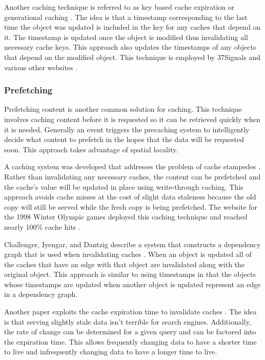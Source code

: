 \documentclass[12pt]{ucthesis}
\begin{document}
Another caching technique is referred to as key based cache expiration \cite{keyBasedCacheExpiration} or generational caching \cite{generationalCaching}.
The idea is that a timestamp corresponding to the last time the object was updated is included in the key for any caches that depend on it.
The timestamp is updated once the object is modified thus invalidating all necessary cache keys.
This approach also updates the timestamps of any objects that depend on the modified object.
This technique is employed by 37Signals and various other websites \cite{keyBasedCacheExpiration}.

\subsubsection{Prefetching}
Prefetching content is another common solution for caching.
This technique involves caching content before it is requested so it can be retrieved quickly when it is needed.
Generally an event triggers the precaching system to intelligently decide what content to prefetch in the hopes that the data will be requested soon.
This approach takes advantage of spatial locality.

A caching system was developed that addresses the problem of cache stampedes \cite{scalableConsistentCaching}.
Rather than invalidating any necessary caches, the content can be prefetched and the cache's value will be updated in place using write-through caching.
This approach avoids cache misses at the cost of slight data staleness because the old copy will still be served while the fresh copy is being prefetched.
The website for the 1998 Winter Olympic games deployed this caching technique and reached nearly 100\% cache hits \cite{scalableConsistentCaching}.

Challenger, Iyengar, and Dantzig describe a system that constructs a dependency graph that is used when invalidating caches \cite{scalableConsistentCaching}.
When an object is updated all of the caches that have an edge with that object are invalidated along with the original object.
This approach is similar to using timestamps in that the objects whose timestamps are updated when another object is updated represent an edge in a dependency graph.

Another paper exploits the cache expiration time to invalidate caches \cite{refreshingPerspectiveSearch}.
The idea is that serving slightly stale data isn't terrible for search engines.
Additionally, the rate of change can be determined for a given query and can be factored into the expiration time.
This allows frequently changing data to have a shorter time to live and infrequently changing data to have a longer time to live.
\end{document}
